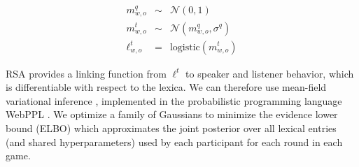 \documentclass[10pt,letterpaper]{article}
\newcommand{\ndg}[1]{\textcolor{Green}{[ndg: #1]}}
\begin{document}
$$
\begin{array}{rcl}
m_{w,o}^q &\sim& \mathcal{N}(0, 1)\\
m_{w,o}^t &\sim& \mathcal{N}(m_{w,o}^q,  \sigma^{q})\\
\ell_{w,o}^t &=& \text{logistic}(m_{w,o}^t)
\end{array}
$$



RSA provides a linking function from $\ell^t$ to speaker and listener behavior, which is differentiable with respect to the lexica.
We can therefore use mean-field variational inference \cite{RanganathGerrishBlei13_BlackBoxVariationalInference}, implemented in the probabilistic programming language WebPPL \cite{GoodmanStuhlmuller14_DIPPL}. We optimize a family of Gaussians to minimize the evidence lower bound (ELBO) which approximates the joint posterior over all lexical entries (and shared hyperparameters) used by each participant for each round in each game. 

\end{document}
